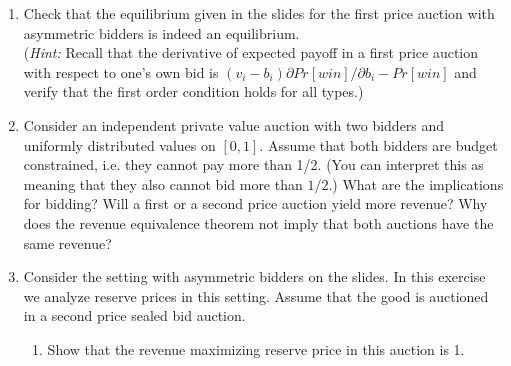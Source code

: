 \documentclass[a4paper,12pt]{article}
\begin{document}
\begin{enumerate}[resume]
\item Check that the equilibrium given in the slides for the first price auction with asymmetric bidders is indeed an equilibrium.\\
  (\emph{Hint: }Recall that the derivative of expected payoff in a first price auction with respect to one's own bid is $(v_i-b_i)\partial Pr[win]/\partial b_i-Pr[win]$ and verify that the first order condition holds for all types.)
\item Consider an independent private value auction with two bidders and uniformly distributed values on $[0,1]$. Assume that both bidders are budget constrained, i.e. they cannot pay more than 1/2. (You can interpret this as meaning that they also cannot bid more than $1/2$.) What are the implications for bidding? Will a first or a second price auction yield more revenue?  Why does the revenue equivalence theorem not imply that both auctions have the same revenue?
\item Consider the setting with asymmetric bidders on the slides. In this exercise we analyze reserve prices in this setting. Assume that the good is auctioned in a second price sealed bid auction.
  \begin{enumerate}
  \item Show that the revenue maximizing reserve price in this auction is 1.

\end{enumerate}
\end{enumerate}
\end{document}
